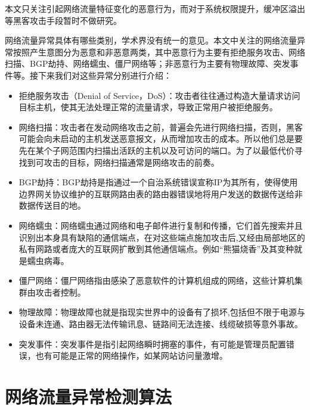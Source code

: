 

本文只关注引起网络流量特征变化的恶意行为，而对于系统权限提升，缓冲区溢出等黑客攻击手段暂时不做研究。


网络流量异常具体有哪些类别，学术界没有统一的意见。本文中关注的网络流量异常按照产生意图分为恶意和非恶意两类，其中恶意行为主要有拒绝服务攻击、网络扫描、BGP劫持、网络蠕虫、僵尸网络等；非恶意行为主要有物理故障、突发事件等。接下来我们对这些异常分别进行介绍：

\begin{itemize}
  \item 拒绝服务攻击（Denial of Service，DoS）：攻击者往往通过构造大量请求访问目标主机，使其无法处理正常的流量请求，导致正常用户被拒绝服务。
  \item 网络扫描：攻击者在发动网络攻击之前，普遍会先进行网络扫描，否则，黑客可能会向未启动的主机发送恶意报文，从而增加攻击的成本。所以他们总是要先在某个子网范围内扫描出活跃的主机以及可访问的端口。为了以最低代价寻找到可攻击的目标，网络扫描通常是网络攻击的前奏。
  \item BGP劫持：BGP劫持是指通过一个自治系统错误宣称IP为其所有，使得使用边界网关协议维护的互联网路由表的路由器错误地将用户发送的数据传送给非数据传送目的地。
  \item 网络蠕虫：网络蠕虫通过网络和电子邮件进行复制和传播，它们首先搜索并且识别出本身具有缺陷的通信端点，在对这些端点施加攻击后,又经由局部地区的私有网路或者庞大的互联网扩散到其他通信端点。例如“熊猫烧香”及其变种就是蠕虫病毒。
  \item 僵尸网络：僵尸网络指由感染了恶意软件的计算机组成的网络，这些计算机集群由攻击者控制。
  \item 物理故障：物理故障也就是指现实世界中的设备有了损坏,包括但不限于电源与设备未连通、路由器无法传输讯息、链路间无法连接、线缆破损等意外事故。
  \item  突发事件：突发事件是指引起网络瞬时拥塞的事件，有可能是管理员配置错误，也有可能是正常的网络操作，如某网站访问量激增。
\end{itemize}

\section{网络流量异常检测算法}


